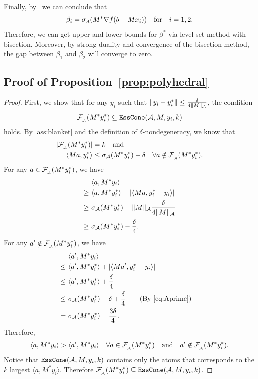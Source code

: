 Finally, by~\cite[Theorem~5.1]{fan2019alignment} we can conclude that 
\[\beta_i = \sigma_{\scriptscriptstyle\mathcal{A}}(M^*\nabla f(b - Mx_i)) \hbox{\quad for\quad} i = 1,2.\]
Therefore, we can get upper and lower bounds for $\beta^*$ via level-set method with bisection. Moreover, by strong duality and convergence of the bisection method, the gap between $\beta_1$ and $\beta_2$ will converge to zero. 

\subsection{Proof of Proposition~\ref{prop:polyhedral}}
\label{app:prop_proof}
\begin{proof}
  First, we show that for any $y_i$ such that $\| y_i - y_i^* \| \leq \frac{\delta}{4\| M \|_{\mathcal{A}}}$, the condition 
  \[\mathcal{F}_{\scriptscriptstyle _{\scriptscriptstyle\mathcal{A}}}( M^* y_i^*) \subseteq \texttt{EssCone}(\mathcal{A}, M, y_i, k)\]
  holds. By \autoref{ass:blanket} and the definition of $\delta$-nondegeneracy, we know that 
  \begin{equation} \label{eq:Aprime}
  \begin{split}
    |  \mathcal{F}_{\scriptscriptstyle _{\scriptscriptstyle\mathcal{A}}}( M^* y_i^*) | &= k \hbox{\quad and\quad} \\
    \langle Ma, y_i^* \rangle &\leq \sigma_{\mathcal{A}}( M^* y_i^* ) - \delta \quad \forall a \notin \mathcal{F}_{\scriptscriptstyle _{\scriptscriptstyle\mathcal{A}}}( M^* y_i^*).
  \end{split}
  \end{equation}
  For any $a \in \mathcal{F}_{\scriptscriptstyle _{\scriptscriptstyle\mathcal{A}}}( M^* y_i^*)$, we have
  \begin{align*}
      & \langle a, M^* y_i \rangle \\
      \geq~& \langle a, M^* y_i^* \rangle - | \langle M a, y_i^* - y_i \rangle | \\
      \geq~& \sigma_{\mathcal{A}}( M^* y_i^* ) - \| M \|_{\mathcal{A}} \frac{\delta}{4\|M\|_{\mathcal{A}}} \\
      \geq~& \sigma_{\mathcal{A}}( M^* y_i^* ) - \frac{\delta}{4}.
  \end{align*}
  For any $a' \notin \mathcal{F}_{\scriptscriptstyle _{\scriptscriptstyle\mathcal{A}}}( M^* y_i^*)$, we have 
  \begin{align*}
      & \langle a', M^* y_i \rangle \\
      \leq~ & \langle a', M^* y_i^* \rangle + | \langle M a', y_i^* - y_i \rangle | \\
      \leq~ & \langle a', M^* y_i^* \rangle + \frac{\delta}{4} \\
      \leq~ & \sigma_{\Ascr}( M^* y_i^* ) - \delta + \frac{\delta}{4} \quad \text{(By \autoref{eq:Aprime})} \\
      =~& \sigma_{\Ascr}( M^* y_i^* ) - \frac{3\delta}{4}.
  \end{align*}
    Therefore, 
    \begin{align*}
        \langle a, M^* y_i \rangle > \langle a', M^* y_i \rangle  \quad \forall a \in \mathcal{F}_{\scriptscriptstyle _{\scriptscriptstyle\mathcal{A}}}( M^* y_i^*) \hbox{\quad and\quad} a' \notin \mathcal{F}_{\scriptscriptstyle _{\scriptscriptstyle\mathcal{A}}}( M^* y_i^*).
    \end{align*}
    Notice that $\texttt{EssCone}(\mathcal{A}, M, y_i, k)$ contains only the atoms that corresponds to the $k$ largest $\langle a, M^* y_i \rangle$. Therefore $\mathcal{F}_{\scriptscriptstyle _{\scriptscriptstyle\mathcal{A}}}( M^* y_i^*) \subseteq \texttt{EssCone}(\mathcal{A}, M, y_i, k)$.
    

\end{proof}
